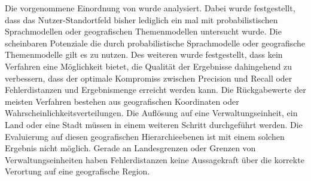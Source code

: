 		Die vorgenommene Einordnung von \cite{Schulz2013} wurde analysiert. 
		Dabei wurde festgestellt, dass das Nutzer-Standortfeld bisher lediglich ein mal mit probabilistischen Sprachmodellen oder geografischen Themenmodellen untersucht wurde.
		Die scheinbaren Potenziale die durch probabilistische Sprachmodelle oder geografische Themenmodelle gilt es zu nutzen.
		Des weiteren wurde festgestellt, dass kein Verfahren eine Möglichkeit bietet, die Qualität der Ergebnisse dahingehend zu verbessern, dass der optimale Kompromiss zwischen Precision und Recall oder Fehlerdistanzen und Ergebnismenge erreicht werden kann.
		Die Rückgabewerte der meisten Verfahren bestehen aus geografischen Koordinaten oder Wahrscheinlichkeitsverteilungen. 
		Die Auflösung auf eine Verwaltungseinheit, ein Land oder eine Stadt müssen in einem weiteren Schritt durchgeführt werden.
		Die Evaluierung auf diesen geografischen Hierarchieebenen ist mit einem solchen Ergebnis nicht möglich. 
		Gerade an Landesgrenzen oder Grenzen von Verwaltungseinheiten haben Fehlerdistanzen keine Aussagekraft über die korrekte Verortung auf eine geografische Region.







